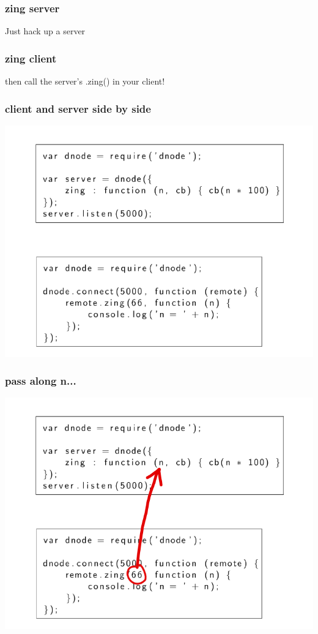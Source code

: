 \documentclass{beamer}
\begin{document}
\begin{frame}
\frametitle{zing server}

\huge
Just hack up a server
\newline

\normalsize
\fbox{
    
}

\end{frame}

\begin{frame}
\frametitle{zing client}

\huge
then call the server's .zing() in your client!
\newline

\normalsize
\fbox{
    
}
\end{frame}

\begin{frame}
\frametitle{client and server side by side}
\includegraphics[scale=0.6]{images/zing_flow_0.png}
\end{frame}

\begin{frame}
\frametitle{pass along n...}
\includegraphics[scale=0.6]{images/zing_flow_1.png}
\end{frame}
\end{document}
